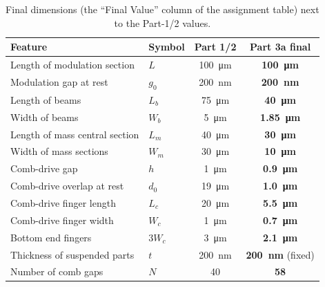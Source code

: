 \begin{table}[H]
\centering
\small
\caption{Final dimensions (the ``Final Value'' column of the assignment
table) next to the Part-1/2 values.}
\label{tab:dims}
\begin{tabular}{llcc}
\toprule
Feature & Symbol & Part 1/2 & \textbf{Part 3a final}\\
\midrule
Length of modulation section & $L$       & \SI{100}{\micro\meter} & \textbf{\SI{100}{\micro\meter}}\\
Modulation gap at rest       & $g_{0}$   & \SI{200}{\nano\meter}  & \textbf{\SI{200}{\nano\meter}}\\
Length of beams              & $L_{b}$   & \SI{75}{\micro\meter}  & \textbf{\SI{40}{\micro\meter}}\\
Width of beams               & $W_{b}$   & \SI{5}{\micro\meter}   & \textbf{\SI{1.85}{\micro\meter}}\\
Length of mass central section & $L_{m}$ & \SI{40}{\micro\meter}  & \textbf{\SI{30}{\micro\meter}}\\
Width of mass sections       & $W_{m}$   & \SI{30}{\micro\meter}  & \textbf{\SI{10}{\micro\meter}}\\
Comb-drive gap               & $h$       & \SI{1}{\micro\meter}   & \textbf{\SI{0.9}{\micro\meter}}\\
Comb-drive overlap at rest   & $d_{0}$   & \SI{19}{\micro\meter}  & \textbf{\SI{1.0}{\micro\meter}}\\
Comb-drive finger length     & $L_{c}$   & \SI{20}{\micro\meter}  & \textbf{\SI{5.5}{\micro\meter}}\\
Comb-drive finger width      & $W_{c}$   & \SI{1}{\micro\meter}   & \textbf{\SI{0.7}{\micro\meter}}\\
Bottom end fingers           & $3W_{c}$  & \SI{3}{\micro\meter}   & \textbf{\SI{2.1}{\micro\meter}}\\
Thickness of suspended parts & $t$       & \SI{200}{\nano\meter}  & \textbf{\SI{200}{\nano\meter}} (fixed)\\
Number of comb gaps          & $N$       & 40                     & \textbf{58}\\
\bottomrule
\end{tabular}
\end{table}

